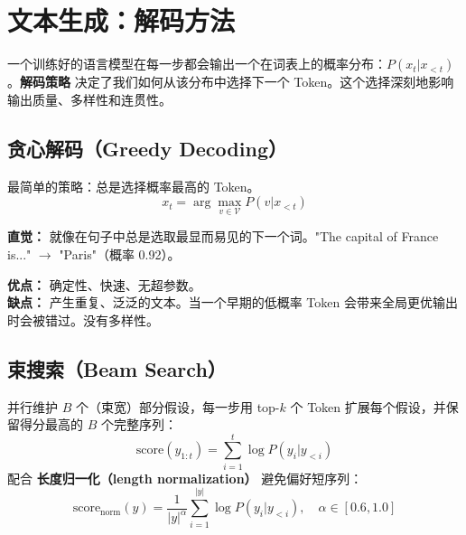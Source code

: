 \section{文本生成：解码方法}
\label{text-generation-decoding-methods}

一个训练好的语言模型在每一步都会输出一个在词表上的概率分布：$P(x_t | x_{<t})$。\textbf{解码策略} 决定了我们如何从该分布中选择下一个 Token。这个选择深刻地影响输出质量、多样性和连贯性。

\subsection{贪心解码（Greedy Decoding）}
\label{greedy-decoding}

最简单的策略：总是选择概率最高的 Token。
\[
x_t = \arg\max_{v \in \mathcal{V}} P(v | x_{<t})
\]

\textbf{直觉：} 就像在句子中总是选取最显而易见的下一个词。"The capital of France is..." $\to$ "Paris"（概率 0.92）。

\textbf{优点：} 确定性、快速、无超参数。\\

\textbf{缺点：} 产生重复、泛泛的文本。当一个早期的低概率 Token 会带来全局更优输出时会被错过。没有多样性。

\subsection{束搜索（Beam Search）}
\label{beam-search}

并行维护 $B$ 个（束宽）部分假设，每一步用 top-$k$ 个 Token 扩展每个假设，并保留得分最高的 $B$ 个完整序列：
\[
\text{score}(y_{1:t}) = \sum_{i=1}^{t} \log P(y_i | y_{<i})
\]
配合 \textbf{长度归一化（length normalization）} 避免偏好短序列：
\[
\text{score}_{\text{norm}}(y) = \frac{1}{|y|^\alpha} \sum_{i=1}^{|y|} \log P(y_i | y_{<i}), \quad \alpha \in [0.6, 1.0]
\]

